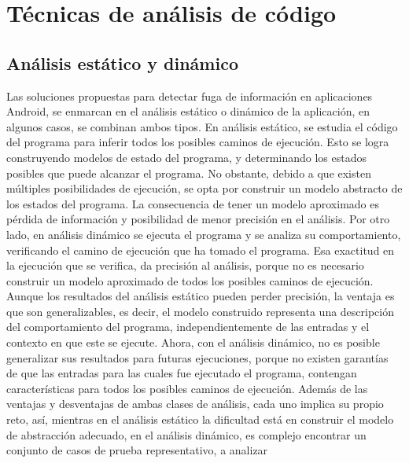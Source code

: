 \section{Técnicas de análisis de código}
\label{sec:contexto}
\subsection{Análisis estático y dinámico}

Las soluciones propuestas para detectar fuga de información en aplicaciones
Android, se enmarcan en el análisis estático o dinámico de la aplicación, en
algunos casos, se combinan ambos tipos.\newline 
En análisis estático\cite{Static-dynamic}, se estudia el código del programa
para inferir todos los posibles caminos de ejecución. Esto se logra construyendo modelos de estado
del programa, y determinando los estados posibles que puede alcanzar el
programa.
No obstante, debido a que existen múltiples posibilidades de ejecución, se opta
por construir un modelo abstracto de los estados del programa. La consecuencia
de tener un modelo aproximado es pérdida de información y posibilidad de menor
precisión en el análisis.\newline 
Por otro lado, en análisis dinámico se ejecuta el programa y se analiza su
comportamiento, verificando el camino de ejecución que ha tomado el programa.
Esa exactitud en la ejecución que se verifica, da precisión al análisis, porque
no es necesario construir un modelo aproximado de todos los posibles caminos de
ejecución.\newline 
Aunque los resultados del análisis estático pueden perder precisión, la ventaja
es que son generalizables, es decir, el modelo construido representa una
descripción del comportamiento del programa, independientemente de las entradas
y el contexto en que este se ejecute. Ahora, con el análisis dinámico, no es
posible generalizar sus resultados para futuras ejecuciones, porque no
existen garantías de que las entradas para las cuales fue ejecutado el programa,
contengan características para todos los posibles caminos de ejecución.\newline 
Además de las ventajas y desventajas de ambas clases de análisis, cada uno
implica su propio reto, así, mientras en el análisis estático la dificultad está
en construir el modelo de abstracción adecuado, en el análisis dinámico, es
complejo encontrar un conjunto de casos de prueba representativo, a analizar
